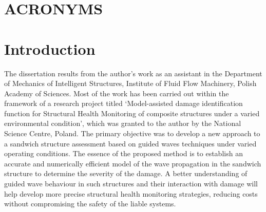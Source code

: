 \documentclass[11pt,a4paper,final]{report}
\begin{document}







\printnomenclature[6em]
\clearpage{}
\clearpage{}

\chapter*{ACRONYMS}
\label{acronyms}
\printacronyms[heading=none,pages={display=first}]\clearpage{}
\clearpage{}



\chapter[Introduction]{Introduction}
\label{ch:intro}
The dissertation results from the author’s work as an assistant in the Department of Mechanics of Intelligent Structures, Institute of Fluid Flow Machinery, Polish Academy of Sciences.
Most of the work has been carried out within the framework of a research project titled ‘Model-assisted damage identification function for Structural Health Monitoring of composite structures under a varied environmental condition', which was granted to the author by the National Science Centre, Poland.
The primary objective was to develop a new approach to a sandwich structure assessment based on guided waves techniques under varied operating conditions.
The essence of the proposed method is to establish an accurate and numerically efficient model of the wave propagation in the sandwich structure to determine the severity of the damage.
A better understanding of guided wave behaviour in such structures and their interaction with damage will help develop more precise structural health monitoring strategies, reducing costs without compromising the safety of the liable systems.
\end{document}
